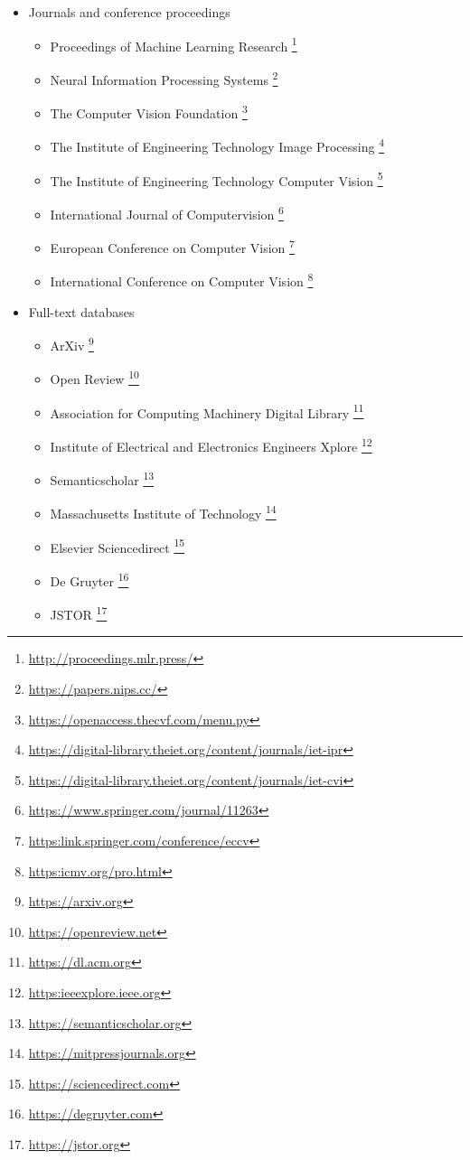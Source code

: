 \begin{itemize}
	\item Journals and conference proceedings
	\begin{itemize}
		\item Proceedings of Machine Learning Research \footnote{\url{http://proceedings.mlr.press/}}
		\item Neural Information Processing Systems \footnote{\url{https://papers.nips.cc/}}
		\item The Computer Vision Foundation \footnote{\url{https://openaccess.thecvf.com/menu.py}}
		\item The Institute of Engineering Technology Image Processing \footnote{\url{https://digital-library.theiet.org/content/journals/iet-ipr}}
		\item The Institute of Engineering Technology Computer Vision \footnote{\url{https://digital-library.theiet.org/content/journals/iet-cvi}}
		\item International Journal of Computervision \footnote{\url{https://www.springer.com/journal/11263}}
		\item European Conference on Computer Vision \footnote{\url{https:link.springer.com/conference/eccv}}
		\item International Conference on Computer Vision \footnote{\url{https:icmv.org/pro.html}}
	\end{itemize}
	\item Full-text databases
	\begin{itemize}
		\item ArXiv \footnote{\url{https://arxiv.org}}
		\item Open Review \footnote{\url{https://openreview.net}}
		\item Association for Computing Machinery Digital Library \footnote{\url{https://dl.acm.org}}
		\item Institute of Electrical and Electronics Engineers Xplore \footnote{\url{https:ieeexplore.ieee.org}}
		\item Semanticscholar \footnote{\url{https://semanticscholar.org}}
		\item Massachusetts Institute of Technology \footnote{\url{https://mitpressjournals.org}}
		\item Elsevier Sciencedirect \footnote{\url{https://sciencedirect.com}}
		\item De Gruyter \footnote{\url{https://degruyter.com}}
		\item JSTOR \footnote{\url{https://jstor.org}}
	\end{itemize}

\end{itemize}
